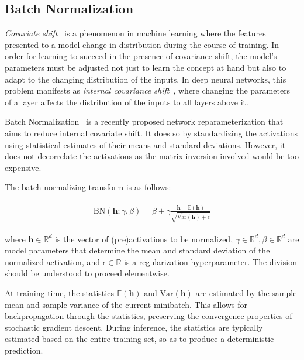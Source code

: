 \documentclass{article} %
\newcommand{\vect}[1]{\mathbf{#1}}
\newcommand{\reals}{\mathbb{R}}
\begin{document}
\subsection{Batch Normalization}

\emph{Covariate shift}~\cite{shimodaira2000improving} is a phenomenon in machine learning where
the features presented to a model change in distribution during the course of training.
In order for learning to succeed in the presence of covariance shift,
the model's parameters must be adjusted not just to learn the concept at hand
but also to adapt to the changing distribution of the inputs.
In deep neural networks, this problem manifests as \emph{internal covariance shift}~\cite{batchnorm},
where changing the parameters of a layer affects the distribution of the inputs to all layers above it.

Batch Normalization~\cite{batchnorm} is a recently proposed network reparameterization that aims to reduce internal covariate shift.
It does so by standardizing the activations using statistical estimates of their means and standard deviations.
However, it does not decorrelate the activations as the matrix inversion involved would be too expensive.

The batch normalizing transform is as follows:

\begin{align}
\mathrm{BN}(\vect{h}; \gamma, \beta) =
  \beta + \gamma
  \frac{\vect{h} -   \widehat{\mathbb{E  }}(\vect{h})}
       {       \sqrt{\widehat{\mathrm{Var}}(\vect{h}) + \epsilon}}
\end{align}

where $\vect{h} \in \reals^d$ is the vector of (pre)activations to be normalized, $\gamma \in \reals^d, \beta \in \reals^d$ are model parameters that determine the mean and standard deviation of the normalized activation, and $\epsilon \in \reals$ is a regularization hyperparameter.
The division should be understood to proceed elementwise.

At training time, the statistics $\mathbb{E}(\vect{h})$ and $\mathrm{Var}(\vect{h})$ are estimated by the sample mean and sample variance of the current minibatch.
This allows for backpropagation through the statistics, preserving the convergence properties of stochastic gradient descent.
During inference, the statistics are typically estimated based on the entire training set, so as to produce a deterministic prediction.
\end{document}
